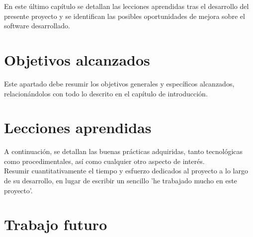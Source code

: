 En este último capítulo se detallan las lecciones aprendidas tras el desarrollo del presente proyecto y se identifican las posibles oportunidades de mejora sobre el software desarrollado.

\section{Objetivos alcanzados}
Este apartado debe resumir los objetivos generales y específicos alcanzados, relacionándolos con todo lo descrito en el capítulo de introducción.\\

\section{Lecciones aprendidas}
A continuación, se detallan las buenas prácticas adquiridas, tanto tecnológicas como procedimentales, así como cualquier otro aspecto de interés.\\
Resumir cuantitativamente el tiempo y esfuerzo dedicados al proyecto a lo largo de su desarrollo, en lugar de escribir un sencillo 'he trabajado mucho en este proyecto'.

\section{Trabajo futuro}
\label{sec:futurework}


